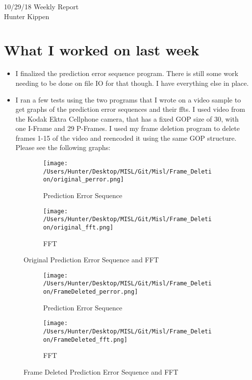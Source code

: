 \documentclass[12pt]{article}%
\def\bi{\begin{itemize}     %
\vspace{-0.5em}\setlength\itemsep{0em}}
\begin{document}
\begin{center}
{\LARGE 10/29/18 Weekly Report}\\
\vspace{0.5em}
{\Large Hunter Kippen}
\vspace{0.5em}
\end{center}


\section{What I worked on last week}
\bi
\item I finalized the prediction error sequence program. There is still some work needing to be done
on file IO for that though. I have everything else in place.
\item I ran a few tests using the two programs that I wrote on a video sample to get graphs of the
prediction error sequences and their ffts. I used video from the Kodak Ektra Cellphone camera, that has a fixed GOP size of 30, with one I-Frame and 29 P-Frames. I used my frame deletion program to delete frames 1-15 of the video and reencoded it using the same GOP structure. Please see the following graphs:
\end{itemize}

\begin{figure}[h!]
  \centering
  \begin{subfigure}[b]{0.4\linewidth}
    \texttt{[image: /Users/Hunter/Desktop/MISL/Git/Misl/Frame\_Deletion/original\_perror.png]}
    \caption{Prediction Error Sequence}
  \end{subfigure}
  \begin{subfigure}[b]{0.4\linewidth}
    \texttt{[image: /Users/Hunter/Desktop/MISL/Git/Misl/Frame\_Deletion/original\_fft.png]}
    \caption{FFT}
  \end{subfigure}
  \caption{Original Prediction Error Sequence and FFT}
  \label{fig:Orig}
\end{figure}

\begin{figure}[h!]
  \centering
  \begin{subfigure}[b]{0.4\linewidth}
    \texttt{[image: /Users/Hunter/Desktop/MISL/Git/Misl/Frame\_Deletion/FrameDeleted\_perror.png]}
    \caption{Prediction Error Sequence}
  \end{subfigure}
  \begin{subfigure}[b]{0.4\linewidth}
    \texttt{[image: /Users/Hunter/Desktop/MISL/Git/Misl/Frame\_Deletion/FrameDeleted\_fft.png]}
    \caption{FFT}
  \end{subfigure}
  \caption{Frame Deleted Prediction Error Sequence and FFT}
  \label{fig:Orig}
\end{figure}
\end{document}
